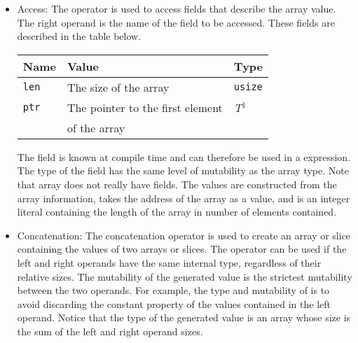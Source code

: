 \begin{itemize}
  \setlength\itemsep{-4pt}
\item Access: The  operator is used to access fields that describe the
  array value. The right operand is the name of the field to be accessed. These
  fields are described in the table below.

  \begin{center}\begin{adjustbox}{max width=\linewidth}
      \begin{threeparttable}
        \begin{tabular}{|l|ll|}
          \hline
          Name & Value & Type\\
          \hline
          \hline
          \texttt{len} & The size of the array & \texttt{usize} \\
          \texttt{ptr} & The pointer to the first element  & \textit{T}$^{1^{\phantom{J}}}$\\
          & of the array & \\
          \hline
        \end{tabular}
      \end{threeparttable}
\end{adjustbox}\end{center}

The  field is known at compile time and can therefore be used in
a  expression. The type of the  field has the same
level of mutability as the array type. Note that array does not really have
fields. The values are constructed from the array information, 
takes the address of the array as a value, and  is an integer
literal containing the length of the array in number of elements contained.

\item Concatenation: The concatenation operator \token{\~} is used to create an
  array or slice containing the values of two arrays or slices. The operator can
  be used if the left and right operands have the same internal type, regardless
  of their relative sizes. The mutability of the generated value is the
  strictest mutability between the two operands. For example, the type and
  mutability of  is \token{[*i32 ;
      6]} to avoid discarding the constant property of the values contained in
  the left operand. Notice that the type of the generated value is an array
  whose size is the sum of the left and right operand sizes.


\end{itemize}
